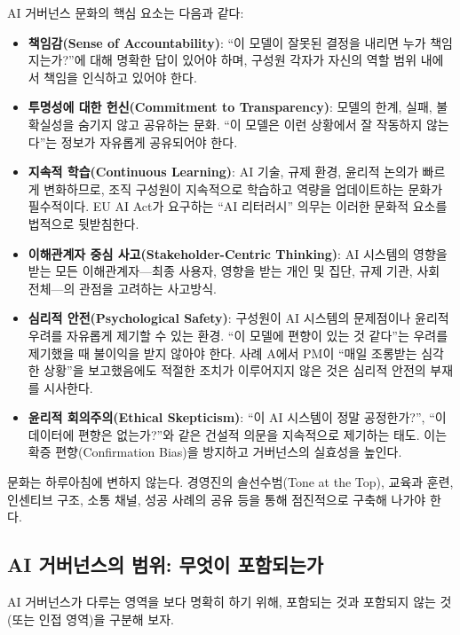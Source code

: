 AI 거버넌스 문화의 핵심 요소는 다음과 같다:
\begin{itemize}
    \item \textbf{책임감(Sense of Accountability)}: ``이 모델이 잘못된 결정을 내리면 누가 책임지는가?''에 대해 명확한 답이 있어야 하며, 구성원 각자가 자신의 역할 범위 내에서 책임을 인식하고 있어야 한다.
    \item \textbf{투명성에 대한 헌신(Commitment to Transparency)}: 모델의 한계, 실패, 불확실성을 숨기지 않고 공유하는 문화. ``이 모델은 이런 상황에서 잘 작동하지 않는다''는 정보가 자유롭게 공유되어야 한다.
    \item \textbf{지속적 학습(Continuous Learning)}: AI 기술, 규제 환경, 윤리적 논의가 빠르게 변화하므로, 조직 구성원이 지속적으로 학습하고 역량을 업데이트하는 문화가 필수적이다. EU AI Act가 요구하는 ``AI 리터러시'' 의무는 이러한 문화적 요소를 법적으로 뒷받침한다.
    \item \textbf{이해관계자 중심 사고(Stakeholder-Centric Thinking)}: AI 시스템의 영향을 받는 모든 이해관계자---최종 사용자, 영향을 받는 개인 및 집단, 규제 기관, 사회 전체---의 관점을 고려하는 사고방식.
    \item \textbf{심리적 안전(Psychological Safety)}: 구성원이 AI 시스템의 문제점이나 윤리적 우려를 자유롭게 제기할 수 있는 환경. ``이 모델에 편향이 있는 것 같다''는 우려를 제기했을 때 불이익을 받지 않아야 한다. 사례 A에서 PM이 ``매일 조롱받는 심각한 상황''을 보고했음에도 적절한 조치가 이루어지지 않은 것은 심리적 안전의 부재를 시사한다.
    \item \textbf{윤리적 회의주의(Ethical Skepticism)}: ``이 AI 시스템이 정말 공정한가?'', ``이 데이터에 편향은 없는가?''와 같은 건설적 의문을 지속적으로 제기하는 태도.\cite{winfield2018ethical} 이는 확증 편향(Confirmation Bias)을 방지하고 거버넌스의 실효성을 높인다.
\end{itemize}

문화는 하루아침에 변하지 않는다. 경영진의 솔선수범(Tone at the Top), 교육과 훈련, 인센티브 구조, 소통 채널, 성공 사례의 공유 등을 통해 점진적으로 구축해 나가야 한다.

\subsection{AI 거버넌스의 범위: 무엇이 포함되는가}
AI 거버넌스가 다루는 영역을 보다 명확히 하기 위해, 포함되는 것과 포함되지 않는 것(또는 인접 영역)을 구분해 보자.

